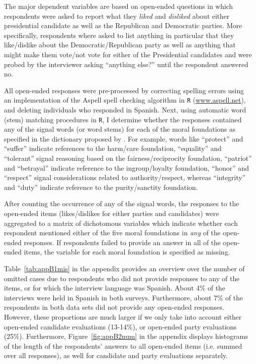 \documentclass[12pt]{article}
\begin{document}
The major dependent variables are based on open-ended questions in which respondents were asked to report what they \textit{liked} and \textit{disliked} about either presidential candidate as well as the Republican and Democratic parties. More specifically, respondents where asked to list anything in particular that they like/dislike about the Democratic/Republican party as well as anything that might make them vote/not vote for either of the Presidential candidates and were probed by the interviewer asking ``anything else?'' until the respondent answered no.

All open-ended responses were pre-processed by correcting spelling errors using an implementation of the Aspell spell checking algorithm in \texttt{R} (\url{www.aspell.net}), and deleting individuals who responded in Spanish. Next, using automatic word (stem) matching procedures in \texttt{R}, I determine whether the responses contained any of the signal words (or word stems) for each of the moral foundations as specified in the dictionary proposed by \citet[][the word lists are also presented in Appendix~\ref{app:oview}]{graham2009liberals}. For example, words like ``protect'' and ``suffer'' indicate references to the harm/care foundation, ``equality'' and ``tolerant'' signal reasoning based on the fairness/reciprocity foundation, ``patriot'' and ``betrayal'' indicate reference to the ingroup/loyalty foundation, ``honor'' and ``respect'' signal considerations related to authority/respect, whereas ``integrity'' and ``duty'' indicate reference to the purity/sanctity foundation.

After counting the occurrence of any of the signal words, the responses to the open-ended items (likes/dislikes for either parties and candidates) were aggregated to a matrix of dichotomous variables which indicate whether each respondent mentioned either of the five moral foundations in \textit{any} of the open-ended responses. If respondents failed to provide an answer in all of the open-ended items, the variable for each moral foundation is specified as missing.

Table~\ref{tab:appB1mis} in the appendix provides an overview over the number of omitted cases due to respondents who did not provide responses to any of the items, or for which the interview language was Spanish. About 4\% of the interviews were held in Spanish in both surveys. Furthermore, about 7\% of the respondents in both data sets did not provide any open-ended responses. However, these proportions are much larger if we only take into account either open-ended candidate evaluations (13-14\%), or open-ended party evaluations (25\%). Furthermore, Figure~\ref{fig:appB2num} in the appendix displays histograms of the length of the respondents' answers to all open-ended items (i.e. summed over all responses), as well for candidate and party evaluations separately.
\end{document}
